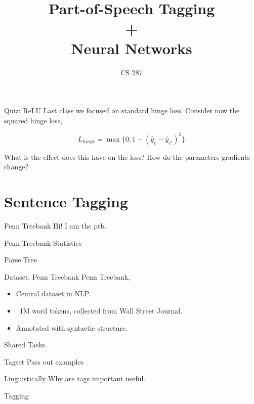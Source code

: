 \documentclass{beamer}
\title{Part-of-Speech Tagging \\ + \\ Neural Networks}
\date{}
\author{CS 287}
\begin{document}
\begin{frame}
  \titlepage
\end{frame}


\begin{frame}{Quiz: ReLU}
  Last class we focused on standard hinge loss. 
  Consider now the squared hinge loss, 

  \[L_{hinge} = \max\{0, 1 - (\hat{y}_c - \hat{y}_{c'})^2 \} \] 

  What is the effect does this have on the loss?
  How do the parameters gradients change?
\end{frame}

\section{Sentence Tagging}

\begin{frame}{Penn Treebank}
  Hi! I am the ptb. 
\end{frame}

\begin{frame}{Penn Treebank}
  Statistics 
\end{frame}

\begin{frame}{Parse Tree}
  
\end{frame}

\begin{frame}{Dataset: Penn Treebank}
  Penn Treebank, \cite{}
  \begin{itemize}
  \item Central dataset in NLP. 
  \item ~1M word tokens, collected from Wall Street Journal.
  \item Annotated with syntactic structure. 
  \end{itemize}
\end{frame}

\begin{frame}{Shared Tasks}
  
\end{frame}

\begin{frame}{Tagset}
  Pass out examples
\end{frame}

\begin{frame}{Linguistically}
  Why are tags important useful. 
\end{frame}

\begin{frame}{Tagging}
  
\end{frame}
\end{document}
